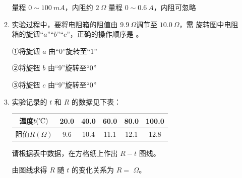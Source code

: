 \begin{enumerate}
\begin{enumerate}
\twochoices
{量程 $ 0 \sim 100 \ mA $，内阻约 $ 2 \ \Omega $}
{量程 $ 0 \sim 0.6 \ A $，内阻可忽略}

\item 
实验过程中，要将电阻箱的阻值由 $ 9.9 \ \Omega $调节至 $ 10.0 \ \Omega $，需
旋转图中电阻箱的旋钮“$ a $”“$ b $”“$ c $”，正确的操作顺序是 \underlinegap 
。

①将旋钮 $ a $ 由“$ 0 $”旋转至“$ 1 $”

②将旋钮 $ b $ 由“$ 9 $”旋转至“$ 0 $”

③将旋钮 $ c $ 由“$ 9 $”旋转至“$ 0 $”



\item 
实验记录的 $ t $ 和 $ R $ 的数据见下表：
\begin{table}[h!]
\centering 
\begin{tabular}{|c|c|c|c|c|c|}
\hline 
温度$ t( \celsius ) $& 20.0 & 40.0 & 60.0 & 80.0 & 100.0
 \\
\hline
阻值$ R( \Omega ) $& 9.6 & 10.4 & 11.1 & 12.1 & 12.8\\ 
\hline 
\end{tabular}
\end{table} 



请根据表中数据，在方格纸上作出 $ R-t $ 图线。
\begin{figure}[h!]
\centering

\end{figure}

由图线求得 $ R $ 随 $ t $ 的变化关系为 $ R= $ \underlinegap $\Omega $。

\end{enumerate}





\end{enumerate}

